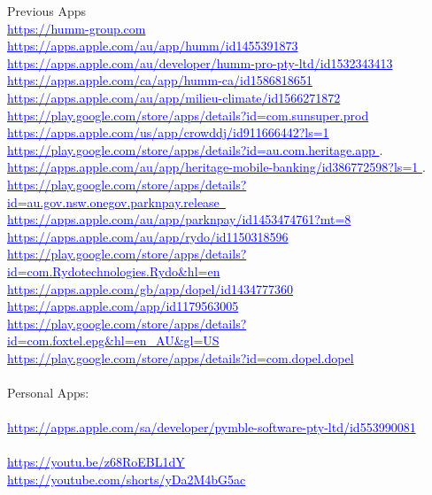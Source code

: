 \documentclass{article}
\begin{document}
Previous Apps \\
\textcolor{blue} { \underline{  https://humm-group.com  } }  \\
\textcolor{blue} { \underline{ https://apps.apple.com/au/app/humm/id1455391873  } }  \\
\textcolor{blue} { \underline{ https://apps.apple.com/au/developer/humm-pro-pty-ltd/id1532343413  } }  \\
\textcolor{blue} { \underline{ https://apps.apple.com/ca/app/humm-ca/id1586818651 } }  \\
\textcolor{blue} { \underline{ https://apps.apple.com/au/app/milieu-climate/id1566271872   } }  \\
\textcolor{blue} { \underline{ https://play.google.com/store/apps/details?id=com.sunsuper.prod   } }  \\
\textcolor{blue} { \underline{  https://apps.apple.com/us/app/crowddj/id911666442?ls=1 }} \\
\textcolor{blue} { \underline{  https://play.google.com/store/apps/details?id=au.com.heritage.app  }}. \\ 
\textcolor{blue} { \underline{  https://apps.apple.com/au/app/heritage-mobile-banking/id386772598?ls=1 }}. \\
\textcolor{blue} { \underline{ https://play.google.com/store/apps/details?id=au.gov.nsw.onegov.parknpay.release\  } }  \\  
\textcolor{blue} { \underline{ https://apps.apple.com/au/app/parknpay/id1453474761?mt=8  } } \\
\textcolor{blue} { \underline{https://apps.apple.com/au/app/rydo/id1150318596 } } \\
\textcolor{blue} { \underline{https://play.google.com/store/apps/details?id=com.Rydotechnologies.Rydo\&hl=en  }}   \\
\textcolor{blue}{ \underline{https://apps.apple.com/gb/app/dopel/id1434777360}} \\
\textcolor{blue} { \underline{https://apps.apple.com/app/id1179563005 } } \\
\textcolor{blue}{ \underline{https://play.google.com/store/apps/details?id=com.foxtel.epg\&hl=en\_AU\&gl=US } }  \\
\textcolor{blue}{ \underline{ https://play.google.com/store/apps/details?id=com.dopel.dopel   }}  \\
\\
Personal Apps:\\
\\
\textcolor{blue}{ \underline{ https://apps.apple.com/sa/developer/pymble-software-pty-ltd/id553990081}}  \\
\\
\textcolor{blue}{ \underline{ https://youtu.be/z68RoEBL1dY }}  \\
\textcolor{blue}{ \underline{ https://youtube.com/shorts/yDa2M4bG5ac }}  \\
\\
\end{document}
